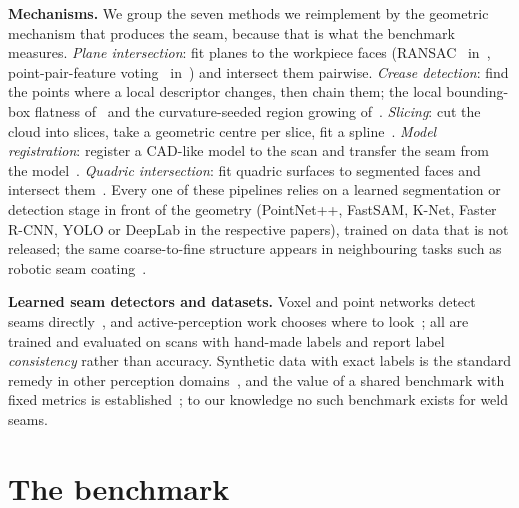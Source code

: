 \documentclass[letterpaper, 10 pt, conference]{ieeeconf}
\begin{document}
\textbf{Mechanisms.} We group the seven methods we reimplement by the geometric mechanism that produces the seam, because that is what the benchmark measures. \emph{Plane intersection}: fit planes to the workpiece faces (RANSAC~\cite{fischler1981ransac} in~\cite{yi2026seam}, point-pair-feature voting~\cite{drost2010ppf} in~\cite{wang2024ppf}) and intersect them pairwise. \emph{Crease detection}: find the points where a local descriptor changes, then chain them; the local bounding-box flatness of~\cite{zhang2025lobb,zhang2025lobbtase} and the curvature-seeded region growing of~\cite{wei2024coarse}. \emph{Slicing}: cut the cloud into slices, take a geometric centre per slice, fit a spline~\cite{wang2026pipe}. \emph{Model registration}: register a CAD-like model to the scan and transfer the seam from the model~\cite{fang2024model}. \emph{Quadric intersection}: fit quadric surfaces to segmented faces and intersect them~\cite{li2026impeller}. Every one of these pipelines relies on a learned segmentation or detection stage in front of the geometry (PointNet++, FastSAM, K-Net, Faster R-CNN, YOLO or DeepLab in the respective papers), trained on data that is not released; the same coarse-to-fine structure appears in neighbouring tasks such as robotic seam coating~\cite{lin2026coating}.

\textbf{Learned seam detectors and datasets.} Voxel and point networks detect seams directly~\cite{wang2024weldnet,song2025lwsnet,zhu2025sanet}, and active-perception work chooses where to look~\cite{tao2026paear}; all are trained and evaluated on scans with hand-made labels and report label \emph{consistency} rather than accuracy. Synthetic data with exact labels is the standard remedy in other perception domains~\cite{tobin2017domain}, and the value of a shared benchmark with fixed metrics is established~\cite{geiger2012kitti}; to our knowledge no such benchmark exists for weld seams.

\section{The benchmark}\label{sec:benchmark}
\end{document}
